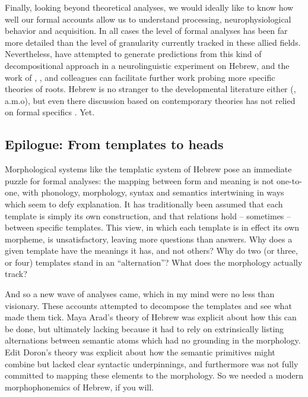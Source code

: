 Finally, looking beyond theoretical analyses, we would ideally like to know how well our formal accounts allow us to understand processing, neurophysiological behavior and acquisition. In all cases the level of formal analyses has been far more detailed than the level of granularity currently tracked in these allied fields. Nevertheless, \cite{kastneretal18} have attempted to generate predictions from this kind of decompositional approach in a neurolinguistic experiment on Hebrew, and the work of \cite{frostetal97}, \cite{fmdpmetal05jml}, \cite{deutschkuperman18} and colleagues can facilitate further work probing more specific theories of roots. Hebrew is no stranger to the developmental literature either (\citealt{berman82,berman93jcl,ashkenazietal16,ravidetaltilar,havronarnon17jcl}, a.m.o), but even there discussion based on contemporary theories has not relied on formal specifics \citep{borer04,kastneradriaans17}. Yet.

	\subsection{Epilogue: From templates to heads}
Morphological systems like the templatic system of Hebrew pose an immediate puzzle for formal analyses: the mapping between form and meaning is not one-to-one, with phonology, morphology, syntax and semantics intertwining in ways which seem to defy explanation. It has traditionally been assumed that each template is simply its own construction, and that relations hold -- sometimes -- between specific templates. This view, in which each template is in effect its own morpheme, is unsatisfactory, leaving more questions than answers. Why does a given template have the meanings it has, and not others? Why do two (or three, or four) templates stand in an ``alternation''? What does the morphology actually track?

And so a new wave of analyses came, which in my mind were no less than visionary. These accounts attempted to decompose the templates and see what made them tick. Maya Arad's theory of Hebrew was explicit about how this can be done, but ultimately lacking because it had to rely on extrinsically listing alternations between semantic atoms which had no grounding in the morphology. Edit Doron's theory was explicit about how the semantic primitives might combine but lacked clear syntactic underpinnings, and furthermore was not fully committed to mapping these elements to the morphology. So we needed a modern morphophonemics of Hebrew, if you will.

